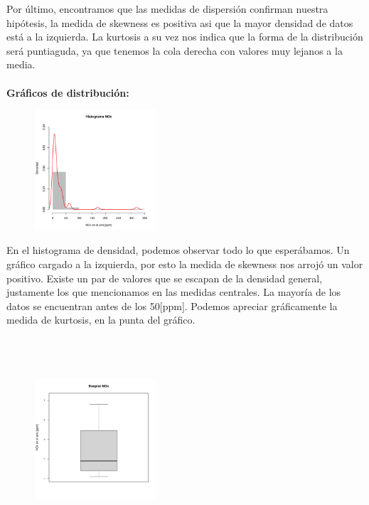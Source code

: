\documentclass[11pt]{article}
\begin{document}
Por último, encontramos que las medidas de dispersión confirman nuestra hipótesis, la medida de skewness es positiva asi que la mayor densidad de datos está a la izquierda. La kurtosis a su vez nos indica que la forma de la distribución será puntiaguda, ya que tenemos la cola derecha con valores muy lejanos a la media.
\\
\\
\textbf{Gráficos de distribución:}
\\

\begin{figure}
    \centering
    \includegraphics[width = 0.4\textwidth]{histnox}
\end{figure}

En el histograma de densidad, podemos observar todo lo que esperábamos. Un gráfico cargado a la izquierda, por esto la medida de skewness nos arrojó un valor positivo. Existe un par de valores que se escapan de la densidad general, justamente los que mencionamos en las medidas centrales. La mayoría de los datos se encuentran antes de los 50[ppm]. Podemos apreciar gráficamente la medida de kurtosis, en la punta del gráfico. 
\\
\\
\\
\\

\begin{figure}
    \centering
    \includegraphics[width = 0.4\textwidth]{boxnox}
\end{figure}
\end{document}
